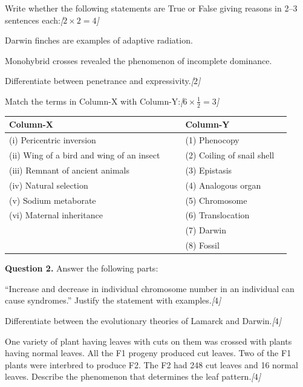 \documentclass[11pt,a4paper]{article}
\newcommand{\pts}[1]{\hfill   \textit{[#1]}}
\begin{document}
\begin{parts}
  \item Write whether the following statements are True or False giving reasons in 2--3 sentences each:\pts{$2  \times 2 = 4$}
  
\begin{parts}
    \item Darwin finches are examples of adaptive radiation.
    \item Monohybrid crosses revealed the phenomenon of incomplete dominance.
  \end{parts}

  \item Differentiate between penetrance and expressivity.\pts{$2$}

  \item Match the terms in Column-X with Column-Y:\pts{$6  \times \frac{1}{2} = 3$}
  
\begin{center}
    \renewcommand{\arraystretch}{1.2}
    
\begin{tabular}{llp{0.5cm}ll}
      \hline
   \textbf{Column-X} & & &   \textbf{Column-Y} \\
      \hline
      (i) Pericentric inversion & & & (1) Phenocopy \\
      (ii) Wing of a bird and wing of an insect & & & (2) Coiling of snail shell \\
      (iii) Remnant of ancient animals & & & (3) Epistasis \\
      (iv) Natural selection & & & (4) Analogous organ \\
      (v) Sodium metaborate & & & (5) Chromosome \\
      (vi) Maternal inheritance & & & (6) Translocation \\
      & & & (7) Darwin \\
      & & & (8) Fossil \\
      \hline
    \end{tabular}
  \end{center}
\end{parts}

\medskip


\noindent   \textbf{Question 2.} Answer the following parts:

\begin{parts}
  \item ``Increase and decrease in individual chromosome number in an individual can cause syndromes.'' Justify the statement with examples.\pts{$4$}
  \item Differentiate between the evolutionary theories of Lamarck and Darwin.\pts{$4$}
  \item One variety of plant having leaves with cuts on them was crossed with plants having normal leaves. All the F1 progeny produced cut leaves. Two of the F1 plants were interbred to produce F2. The F2 had 248 cut leaves and 16 normal leaves. Describe the phenomenon that determines the leaf pattern.\pts{$4$}
\end{parts}
\end{document}
